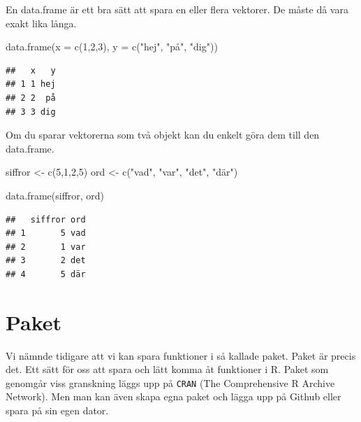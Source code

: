 \documentclass[
]{book}
\newenvironment{Shaded}{\begin{snugshade}}{\end{snugshade}}
\newcommand{\AttributeTok}[1]{\textcolor[rgb]{0.77,0.63,0.00}{#1}}
\newcommand{\DecValTok}[1]{\textcolor[rgb]{0.00,0.00,0.81}{#1}}
\newcommand{\FunctionTok}[1]{\textcolor[rgb]{0.00,0.00,0.00}{#1}}
\newcommand{\NormalTok}[1]{#1}
\newcommand{\OtherTok}[1]{\textcolor[rgb]{0.56,0.35,0.01}{#1}}
\newcommand{\StringTok}[1]{\textcolor[rgb]{0.31,0.60,0.02}{#1}}
\begin{document}
En data.frame är ett bra sätt att spara en eller flera vektorer. De måste då vara exakt lika långa.

\begin{Shaded}
\begin{Highlighting}[]
\FunctionTok{data.frame}\NormalTok{(}\AttributeTok{x =} \FunctionTok{c}\NormalTok{(}\DecValTok{1}\NormalTok{,}\DecValTok{2}\NormalTok{,}\DecValTok{3}\NormalTok{),}
           \AttributeTok{y =} \FunctionTok{c}\NormalTok{(}\StringTok{"hej"}\NormalTok{, }\StringTok{"på"}\NormalTok{, }\StringTok{"dig"}\NormalTok{))}
\end{Highlighting}
\end{Shaded}

\begin{verbatim}
##   x   y
## 1 1 hej
## 2 2  på
## 3 3 dig
\end{verbatim}

Om du sparar vektorerna som två objekt kan du enkelt göra dem till den data.frame.

\begin{Shaded}
\begin{Highlighting}[]
\NormalTok{siffror }\OtherTok{\textless{}{-}} \FunctionTok{c}\NormalTok{(}\DecValTok{5}\NormalTok{,}\DecValTok{1}\NormalTok{,}\DecValTok{2}\NormalTok{,}\DecValTok{5}\NormalTok{)}
\NormalTok{ord }\OtherTok{\textless{}{-}} \FunctionTok{c}\NormalTok{(}\StringTok{"vad"}\NormalTok{, }\StringTok{"var"}\NormalTok{, }\StringTok{"det"}\NormalTok{, }\StringTok{"där"}\NormalTok{)}

\FunctionTok{data.frame}\NormalTok{(siffror, ord)}
\end{Highlighting}
\end{Shaded}

\begin{verbatim}
##   siffror ord
## 1       5 vad
## 2       1 var
## 3       2 det
## 4       5 där
\end{verbatim}

\hypertarget{paket}{%
\section{Paket}\label{paket}}

Vi nämnde tidigare att vi kan spara funktioner i så kallade paket. Paket är precis det. Ett sätt för oss att spara och lätt komma åt funktioner i R. Paket som genomgår viss granskning läggs upp på \texttt{CRAN} (The Comprehensive R Archive Network). Men man kan även skapa egna paket och lägga upp på Github eller spara på sin egen dator.
\end{document}
